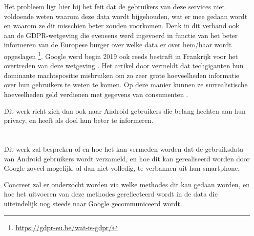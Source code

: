 Het probleem ligt hier bij het feit dat de gebruikers van deze services niet voldoende weten waarom deze data wordt bijgehouden, wat er mee gedaan wordt en waarom ze dit misschien beter zouden voorkomen. Denk in dit verband ook aan de GDPR-wetgeving die eveneens werd ingevoerd in functie van het beter informeren van de Europese burger over welke data er over hem/haar wordt opgeslagen \footnote{\url{https://gdpr-eu.be/wat-is-gdpr/}}. Google werd begin 2019 ook reeds bestraft in Frankrijk voor het overtreden van deze wetgeving \autocite{Boete2019}. Het artikel door \cite{LaurensVerhagen2019} vermeldt dat techgiganten hun dominante machtspositie misbruiken om zo zeer grote hoeveelheden informatie over hun gebruikers te weten te komen. Op deze manier kunnen ze surrealistische hoeveelheden geld verdienen met gegevens van consumenten \autocite{propken_google-data}. 

Dit werk richt zich dan ook naar Android gebruikers die belang hechten aan hun privacy, en heeft als doel hun beter te informeren.


\section{}
\label{sec:onderzoeksvraag}

Dit werk zal bespreken of en hoe het kan vermeden worden dat de gebruiksdata van Android gebruikers wordt verzameld, en hoe dit kan gerealiseerd worden door Google zoveel mogelijk, al dan niet volledig, te verbannen uit hun smartphone.

Concreet zal er onderzocht worden via welke methodes dit kan gedaan worden, en hoe het uitvoeren van deze methodes gereflecteerd wordt in de data die uiteindelijk nog steeds naar Google gecommuniceerd wordt.

